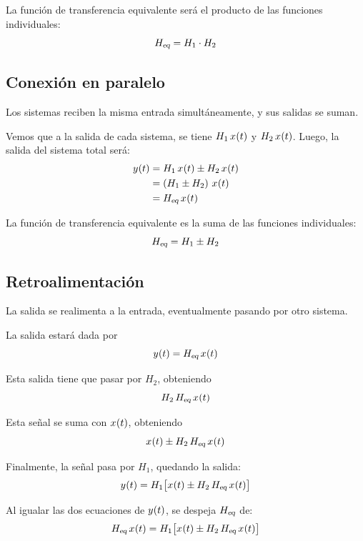 La función de transferencia equivalente será el producto de las funciones individuales:
\[
    \sub{H}{eq} = H_1 \cdot H_2
\]

\subsection{Conexión en paralelo}

Los sistemas reciben la misma entrada simultáneamente, y sus salidas se suman.

\begin{center}
    \def\svgwidth{0.8\linewidth}
    
\end{center}

Vemos que a la salida de cada sistema, se tiene $H_1 \, \fx[x]{t}$ y $H_2 \, \fx[x]{t}$.
Luego, la salida del sistema total será:
\begin{align*}
    \fx[y]{t}
    & = H_1 \, \fx[x]{t} \pm H_2 \, \fx[x]{t}
    \\
    & = \inParentheses{H_1 \pm H_2} \, \fx[x]{t}
    \\
    & = \sub{H}{eq} \, \fx[x]{t}
\end{align*}

La función de transferencia equivalente es la suma de las funciones individuales:
\[
    \sub{H}{eq} = H_1 \pm H_2
\]

\subsection{Retroalimentación}

La salida se realimenta a la entrada, eventualmente pasando por otro sistema.

\begin{center}
    \def\svgwidth{0.8\linewidth}
    
\end{center}

La salida estará dada por
\[
    \fx[y]{t} = \sub{H}{eq} \, \fx[x]{t}
\]

Esta salida tiene que pasar por $H_2$, obteniendo
\[
    H_2 \, \sub{H}{eq} \, \fx[x]{t}
\]

Esta señal se suma con $\fx[x]{t}$, obteniendo
\[
    \fx[x]{t} \pm H_2 \, \sub{H}{eq} \, \fx[x]{t}
\]

Finalmente, la señal pasa por $H_1$, quedando la salida:
\[
    \fx[y]{t} = H_1 \inBrackets{\fx[x]{t} \pm H_2 \, \sub{H}{eq} \, \fx[x]{t}}
\]

Al igualar las dos ecuaciones de $\fx[y]{t}$, se despeja $\sub{H}{eq}$ de:
\[
    \sub{H}{eq} \, \fx[x]{t}
    = H_1 \inBrackets{\fx[x]{t} \pm H_2 \, \sub{H}{eq} \, \fx[x]{t}}
\]

